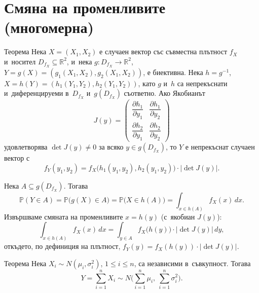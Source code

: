 \section{Смяна на променливите (многомерна)}

\begin{thmbox}[]{Теорема}
Нека $X=(X_1,X_2)$ е случаен вектор със съвместна плътност $f_X$ и~носител $D_{f_X}\subseteq\mathbb R^2$, и~нека $g:D_{f_X}\to\mathbb
R^2$, $Y=g(X)=(g_1(X_1,X_2),g_2(X_1,X_2))$, е биективна. Нека
$h=g^{-1}$, $X=h(Y)=(h_1(Y_1,Y_2),h_2(Y_1,Y_2))$, като $g$ и~$h$ са
непрекъснати и~диференцируеми в~$D_{f_X}$ и~$g(D_{f_X})$
съответно. Ако Якобианът
\[
  J(y) = \begin{pmatrix}\dfrac{\partial h_1}{\partial y_1} & \dfrac{\partial h_1}{\partial y_2}\\[1ex] \dfrac{\partial h_2}{\partial y_1} & \dfrac{\partial h_2}{\partial y_2}\end{pmatrix}
\]
удовлетворява $\det J(y)\neq0$ за всяко $y\in g(D_{f_X})$, то $Y$ е
непрекъснат случаен вектор с~\[
  f_Y(y_1,y_2) = f_X\big(h_1(y_1,y_2),h_2(y_1,y_2)\big)\cdot\big|\det J(y)\big|.
\]
\end{thmbox}

\begin{proofbox}
Нека $A\subseteq g(D_{f_X})$. Тогава
\[
  \mathbb P(Y\in A) = \mathbb P\big(g(X)\in A\big) = \mathbb P\big(X\in h(A)\big) = \int_{x\in h(A)} f_X(x)\,dx.
\]
Извършваме смяната на променливите $x=h(y)$ (с~якобиан $J(y)$):
\[
  \int_{x\in h(A)} f_X(x)\,dx = \int_{y\in A} f_X\big(h(y)\big)\cdot|\det J(y)|\,dy,
\]
откъдето, по дефиниция на плътност, $f_Y(y) = f_X(h(y))\cdot|\det J(y)|$. \qedbg
\end{proofbox}

\begin{thmbox}{Теорема}
Нека $X_i\sim N(\mu_i,\sigma_i^2)$, $1\le i\le n$, са независими в~съвкупност. Тогава
\[
  Y = \sum_{i=1}^{n} X_i \sim N\Big(\sum_{i=1}^n \mu_i,\ \sum_{i=1}^n \sigma_i^2\Big).
\]
\end{thmbox}


